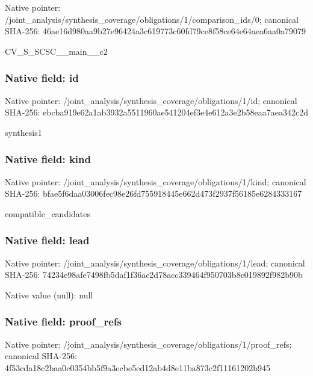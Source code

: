 \documentclass[10pt,a4paper]{article}
\begin{document}
Native pointer: /joint\_analysis/synthesi\allowbreak{}s\_coverage/obligations/1\allowbreak{}/comparison\_ids/0; canonical SHA-256: 46ae16d980aa9b27e96424a3\allowbreak{}c619773c60fd79ce8f58ce64\allowbreak{}e64aea6aa0a79079


CV\_S\_SCSC\_\_main\_\_c2


\subsubsection{Native field: id}


Native pointer: /joint\_analysis/synthesi\allowbreak{}s\_coverage/obligations/1\allowbreak{}/id; canonical SHA-256: ebcba919e62a1ab3932a5511\allowbreak{}960ae541204ef3e4e612a3e2\allowbreak{}b58eaa7aea342c2d


synthesis1


\subsubsection{Native field: kind}


Native pointer: /joint\_analysis/synthesi\allowbreak{}s\_coverage/obligations/1\allowbreak{}/kind; canonical SHA-256: bfae5f6daa03006fec98e26f\allowbreak{}d755918445e662d473f2937f\allowbreak{}56185e6284333167


compatible\_candidates


\subsubsection{Native field: lead}


Native pointer: /joint\_analysis/synthesi\allowbreak{}s\_coverage/obligations/1\allowbreak{}/lead; canonical SHA-256: 74234e98afe7498fb5daf1f3\allowbreak{}6ac2d78acc339464f950703b\allowbreak{}8c019892f982b90b



Native value (null): null



\subsubsection{Native field: proof\_refs}


Native pointer: /joint\_analysis/synthesi\allowbreak{}s\_coverage/obligations/1\allowbreak{}/proof\_refs; canonical SHA-256: 4f53cda18c2baa0c0354bb5f\allowbreak{}9a3ecbe5ed12ab4d8e11ba87\allowbreak{}3c2f11161202b945
\end{document}
